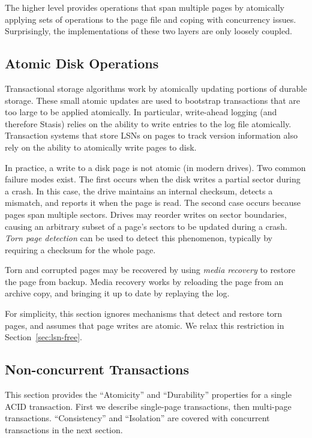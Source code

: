 \documentclass[letterpaper,twocolumn,10pt]{article}
\newcommand{\yad}{Stasis\xspace}
\begin{document}
The higher level provides operations that span multiple pages by
atomically applying sets of operations to the page file and coping
with concurrency issues.  Surprisingly, the implementations of these
two layers are only loosely coupled.


\subsection{Atomic Disk Operations}

Transactional storage algorithms work by
atomically updating portions of durable storage.  These small atomic
updates are used to bootstrap transactions that are too large to be
applied atomically.  In particular, write-ahead logging (and therefore
\yad) relies on the ability to write entries to the log
file atomically.  Transaction systems that store LSNs on pages to 
track version information also rely on the ability to atomically 
write pages to disk.

In practice, a write to a disk page is not atomic (in modern drives).  Two common failure
modes exist.  The first occurs when the disk writes a partial sector
during a crash.  In this case, the drive maintains an internal
checksum, detects a mismatch, and reports it when the page is read.
The second case occurs because pages span multiple sectors.  Drives
may reorder writes on sector boundaries, causing an arbitrary subset
of a page's sectors to be updated during a crash.  {\em Torn page
detection} can be used to detect this phenomenon, typically by
requiring a checksum for the whole page. 

Torn and corrupted pages may be recovered by using {\em media
recovery} to restore the page from backup.  Media recovery works by
reloading the page from an archive copy, and bringing it up to date by
replaying the log.

For simplicity, this section ignores mechanisms that detect
and restore torn pages, and assumes that page writes are atomic.
We relax this restriction in Section~\ref{sec:lsn-free}.

\subsection{Non-concurrent Transactions}

This section provides the ``Atomicity'' and ``Durability'' properties
for a single ACID transaction.
First we describe single-page transactions, then multi-page transactions.
``Consistency'' and ``Isolation'' are covered with 
concurrent transactions in the next section.
\end{document}

